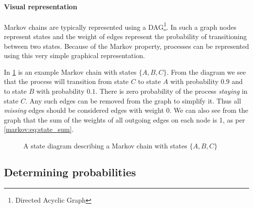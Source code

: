 \paragraph{Visual representation}
Markov chains are typically represented using a DAG\footnote{Directed Acyclic Graph}.
In such a graph nodes represent states and the weight of edges represent the probability of transitioning between two states.
Because of the Markov property, processes can be represented using this very simple graphical representation.

In \cref{markov:model:example1} is an example Markov chain with states $\{A, B, C\}$.
From the diagram we see that the process will transition from state $C$ to state $A$ with probability $0.9$ and to state $B$ with probability $0.1$.
There is zero probability of the process \textit{staying} in state $C$.
Any such edges can be removed from the graph to simplify it.
Thus all \emph{missing} edges should be considered edges with weight 0.
We can also see from the graph that the sum of the weights of all outgoing edges on each node is 1, as per \cref{markov:eq:state_sum}.

\begin{figure}
\centering
{}
\caption{A state diagram describing a Markov chain with states $\{A, B, C\}$}
\label{markov:model:example1}
\end{figure}

\subsection{Determining probabilities}

